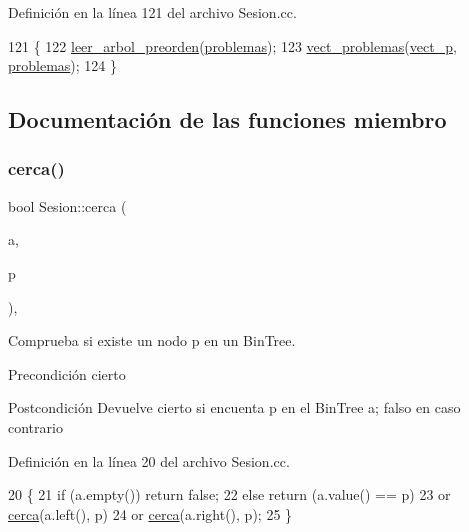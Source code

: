 Definición en la línea 121 del archivo Sesion.\+cc.


\begin{DoxyCode}
121                      \{
122         \mbox{\hyperlink{class_sesion_ac3711bf39cf87739aff96ccebd6da0bc}{leer\_arbol\_preorden}}(\mbox{\hyperlink{class_sesion_a7125fb9a733e06305e8e8889926b8d1b}{problemas}});
123         \mbox{\hyperlink{class_sesion_a9ed9478b2d860d8d713e19823febeaf3}{vect\_problemas}}(\mbox{\hyperlink{class_sesion_ab9459a157fdb5e1c2f975ba20305ae8f}{vect\_p}}, \mbox{\hyperlink{class_sesion_a7125fb9a733e06305e8e8889926b8d1b}{problemas}});
124       \}
\end{DoxyCode}


\subsection{Documentación de las funciones miembro}
\mbox{\label{class_sesion_a975a083d65d04704efd0690de9d7f695}} 
\subsubsection{\texorpdfstring{cerca()}{cerca()}}
{\footnotesize\ttfamily bool Sesion\+::cerca (\begin{DoxyParamCaption}\item[{const Bin\+Tree$<$ string $>$ \&}]{a,  }\item[{const string \&}]{p }\end{DoxyParamCaption})\hspace{0.3cm}{\ttfamily [static]}, {\ttfamily [private]}}



Comprueba si existe un nodo p en un Bin\+Tree. 

\begin{DoxyPrecond}{Precondición}
cierto 
\end{DoxyPrecond}
\begin{DoxyPostcond}{Postcondición}
Devuelve cierto si encuenta p en el Bin\+Tree a; falso en caso contrario 
\end{DoxyPostcond}


Definición en la línea 20 del archivo Sesion.\+cc.


\begin{DoxyCode}
20                                                                   \{
21         \textcolor{keywordflow}{if} (a.empty()) \textcolor{keywordflow}{return} \textcolor{keyword}{false};
22         \textcolor{keywordflow}{else} \textcolor{keywordflow}{return} (a.value() == p)
23                     or \mbox{\hyperlink{class_sesion_a975a083d65d04704efd0690de9d7f695}{cerca}}(a.left(), p)
24                     or \mbox{\hyperlink{class_sesion_a975a083d65d04704efd0690de9d7f695}{cerca}}(a.right(), p);
25       \}
\end{DoxyCode}
\mbox{\label{class_sesion_ac3711bf39cf87739aff96ccebd6da0bc}} 
